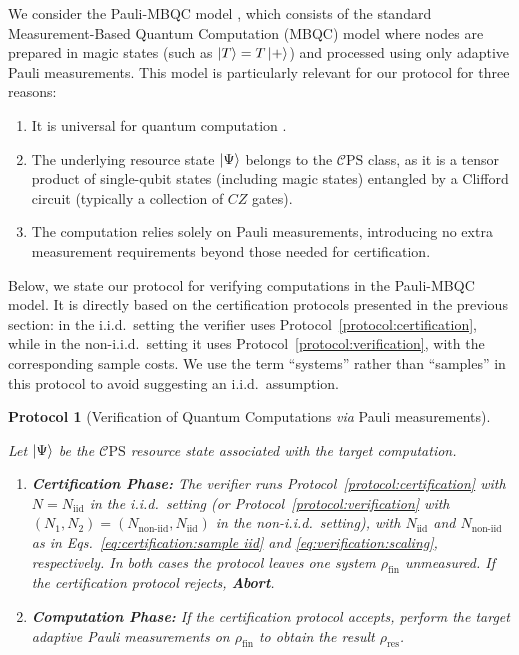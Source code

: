 \documentclass[a4paper,twocolumn,11pt,unpublished]{quantumarticle}
\newtheorem{protocol}{Protocol}
\newcommand{\Niid}{N_{\mathrm{iid}}}
\newcommand{\Nnoniid}{N_{\mathrm{non\text{-}iid}}}
\newcommand{\mCEPS}{\mathcal{C}\text{PS}}
\begin{document}
We consider the Pauli-MBQC model \cite{SDKO07direct}, which consists of the standard Measurement-Based Quantum Computation (MBQC) model where nodes are prepared in magic states (such as $\ket{T} = T\ket{+}$) and processed using only adaptive Pauli measurements. This model is particularly relevant for our protocol for three reasons:
\begin{enumerate}
    \item It is universal for quantum computation \cite{SDKO07direct}.
    \item The underlying resource state $\ket{\Psi}$ belongs to the $\mCEPS$ class, as it is a tensor product of single-qubit states (including magic states) entangled by a Clifford circuit (typically a collection of $CZ$ gates).
    \item The computation relies solely on Pauli measurements, introducing no extra measurement requirements beyond those needed for certification.
\end{enumerate}
Below, we state our protocol for verifying computations in the Pauli-MBQC model. It is directly based on the certification protocols presented in the previous section: in the i.i.d.\ setting the verifier uses Protocol~\ref{protocol:certification}, while in the non-i.i.d.\ setting it uses Protocol~\ref{protocol:verification}, with the corresponding sample costs. We use the term ``systems'' rather than ``samples'' in this protocol to avoid suggesting an i.i.d.\ assumption.
\begin{protocol}[Verification of Quantum Computations \textit{via} Pauli measurements]
    \label{protocol:verification of UQC}

    Let $\ket\Psi$ be the $\mCEPS$ resource state associated with the target computation.

    \begin{enumerate}

        \item \textbf{Certification Phase:}
        The verifier runs Protocol~\ref{protocol:certification} with $N = \Niid$ in the i.i.d.\ setting (or Protocol~\ref{protocol:verification} with $(N_1,N_2) = (\Nnoniid,\Niid)$ in the non-i.i.d.\ setting), with $\Niid$ and $\Nnoniid$ as in Eqs.~\eqref{eq:certification:sample iid} and \eqref{eq:verification:scaling}, respectively. In both cases the protocol leaves one system $\rho_{\mathrm{fin}}$ unmeasured. If the certification protocol rejects, \textbf{Abort}.

        \item \textbf{Computation Phase:}
        If the certification protocol accepts, perform the target adaptive Pauli measurements on $\rho_{\mathrm{fin}}$ to obtain the result $\rho_{\mathrm{res}}$.

    \end{enumerate}
\end{protocol}
\end{document}
